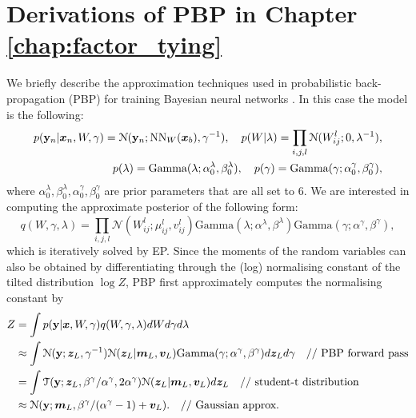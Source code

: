 \section{Derivations of PBP in Chapter \ref{chap:factor_tying}}
\label{sec:appendix_pbp}

We briefly describe the approximation techniques used in probabilistic back-propagation (PBP) for training Bayesian neural networks \citep{hernandez-lobato:pbp2015}. In this case the model is the following:
\begin{equation}
\centering
\begin{aligned}
p(\y_n| \x_n, W, \gamma) = \mathcal{N}(\y_n; \text{NN}_{W}(\x_b), \gamma^{-1}), \quad
p(W | \lambda) = \prod_{i, j, l} \mathcal{N}(W_{ij}^l; 0, \lambda^{-1}), \\ 
p(\lambda) = \text{Gamma}(\lambda; \alpha_0^{\lambda}, \beta_0^{\lambda}), \quad p(\gamma) = \text{Gamma}(\gamma; \alpha_0^{\gamma}, \beta_0^{\gamma}),
\end{aligned}
\end{equation}
where $\alpha_0^{\lambda}, \beta_0^{\lambda}, \alpha_0^{\gamma}, \beta_0^{\gamma}$ are prior parameters that are all set to 6.
%
We are interested in computing the approximate posterior of the following form:
\begin{equation}
q(W, \gamma, \lambda) = \prod_{i, j, l} \mathcal{N}(W_{ij}^l ; \mu_{ij}^l, v_{ij}^l) \text{Gamma}(\lambda; \alpha^{\lambda}, \beta^{\lambda}) \text{Gamma}(\gamma; \alpha^{\gamma}, \beta^{\gamma}),
\end{equation}
which is iteratively solved by EP. Since the moments of the random variables can also be obtained by differentiating through the (log) normalising constant of the tilted distribution $\log Z$, PBP first approximately computes the normalising constant by
\begin{equation}
\begin{aligned}
Z &= \int p(\mathbf{y}| \bm{x}, W, \gamma) q(W, \gamma, \lambda) dW d\gamma d\lambda \\
&\approx \int \mathcal{N}(\mathbf{y} ; \bm{z}_L, \gamma^{-1}) \mathcal{N}(\bm{z}_L | \bm{m}_{L}, \bm{v}_{L}) \text{Gamma}(\gamma; \alpha^{\gamma}, \beta^{\gamma}) d\bm{z}_L d\gamma \quad \text{// PBP forward pass} \\
&= \int \mathcal{T}(\mathbf{y} ; \bm{z}_L, \beta^{\gamma} / \alpha^{\gamma}, 2 \alpha^{\gamma}) \mathcal{N}(\bm{z}_L | \bm{m}_{L}, \bm{v}_{L}) d\bm{z}_L \quad \text{// student-t distribution} \\
&\approx \mathcal{N}(\mathbf{y}; \bm{m}_{L}, \beta^{\gamma} / (\alpha^{\gamma} - 1) + \bm{v}_L). \quad \text{// Gaussian approx.}
\end{aligned}
\end{equation}
